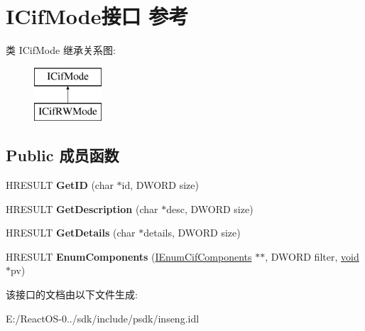 \hypertarget{interface_i_cif_mode}{}\section{I\+Cif\+Mode接口 参考}
\label{interface_i_cif_mode}
类 I\+Cif\+Mode 继承关系图\+:\begin{figure}[H]
\begin{center}
\leavevmode
\includegraphics[height=2.000000cm]{interface_i_cif_mode}
\end{center}
\end{figure}
\subsection*{Public 成员函数}
\begin{DoxyCompactItemize}
\item 
\mbox{\label{interface_i_cif_mode_a2159a8bd854a80c043c85d92f9df2c0f}} 
H\+R\+E\+S\+U\+LT {\bfseries Get\+ID} (char $\ast$id, D\+W\+O\+RD size)
\item 
\mbox{\label{interface_i_cif_mode_a0cee6ca0688e3796eb6b1e762e74aa3a}} 
H\+R\+E\+S\+U\+LT {\bfseries Get\+Description} (char $\ast$desc, D\+W\+O\+RD size)
\item 
\mbox{\label{interface_i_cif_mode_a893c15b00122bdef32db7259056a8686}} 
H\+R\+E\+S\+U\+LT {\bfseries Get\+Details} (char $\ast$details, D\+W\+O\+RD size)
\item 
\mbox{\label{interface_i_cif_mode_ad353e79831dc24c2f1d02cb924565a27}} 
H\+R\+E\+S\+U\+LT {\bfseries Enum\+Components} (\hyperlink{interface_i_enum_cif_components}{I\+Enum\+Cif\+Components} $\ast$$\ast$, D\+W\+O\+RD filter, \hyperlink{interfacevoid}{void} $\ast$pv)
\end{DoxyCompactItemize}


该接口的文档由以下文件生成\+:\begin{DoxyCompactItemize}
\item 
E\+:/\+React\+O\+S-\/0../sdk/include/psdk/inseng.\+idl\end{DoxyCompactItemize}
